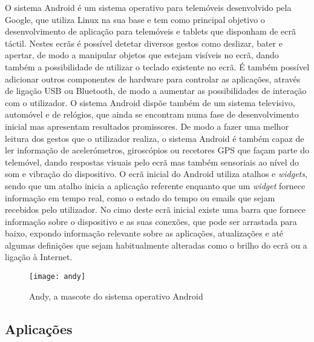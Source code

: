 O sistema Android é um sistema operativo para telemóveis desenvolvido pela Google, que utiliza Linux na sua base e tem como principal objetivo o desenvolvimento de aplicação para telemóveis e tablets que disponham de ecrã táctil.
Nestes ecrãs é possível detetar diversos gestos como deslizar, bater e apertar, de modo a manipular objetos que estejam visíveis no ecrã, dando também a possibilidade de utilizar o teclado existente no ecrã.
É também possível adicionar outros componentes de hardware para controlar as aplicações, através de ligação USB ou Bluetooth, de modo a aumentar as possibilidades de interação com o utilizador.
O sistema Android dispõe também de um sistema televisivo, automóvel e de relógios, que ainda se encontram numa fase de desenvolvimento inicial mas apresentam resultados promissores.
De modo a fazer uma melhor leitura dos gestos que o utilizador realiza, o sistema Android é também capaz de ler informação de acelerómetros, giroscópios ou recetores GPS que façam parte do telemóvel, dando respostas visuais pelo ecrã mas também sensoriais ao nível do som e vibração do dispositivo.
O ecrã inicial do Android utiliza atalhos e \emph{widgets}, sendo que um atalho inicia a aplicação referente enquanto que um \emph{widget} fornece informação em tempo real, como o estado do tempo ou emails que sejam recebidos pelo utilizador.
No cimo deste ecrã inicial existe uma barra que fornece informação sobre o dispositivo e as suas conexões, que pode ser arrastada para baixo, expondo informação relevante sobre as aplicações, atualizações e até algumas definições que sejam habitualmente alteradas como o brilho do ecrã ou a ligação à Internet.

\begin{figure}[hbtp]
	\centering
	\texttt{[image: andy]}
	\caption[Andy, a mascote do sistema operativo Android]{Andy, a mascote do sistema operativo Android\footnotemark}
	\label{fig:andy}
\end{figure}

\subsection{Aplicações}
\label{sub:aplicacoes}


